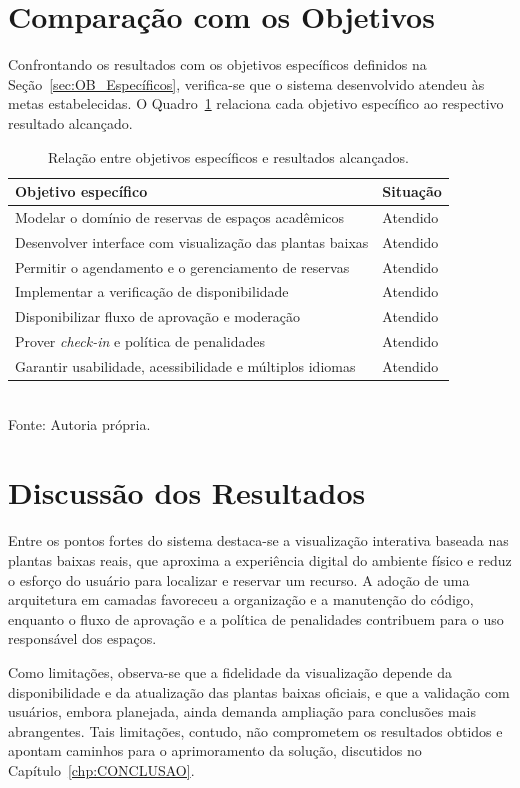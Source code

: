 \section{Comparação com os Objetivos}\label{sec:comparacao}

Confrontando os resultados com os objetivos específicos definidos na Seção~\ref{sec:OB_Específicos}, verifica-se que o sistema desenvolvido atendeu às metas estabelecidas. O Quadro~\ref{quadro:objetivos} relaciona cada objetivo específico ao respectivo resultado alcançado.

\begin{table}[H]
  \centering
  \caption{Relação entre objetivos específicos e resultados alcançados.}
  \label{quadro:objetivos}
  \begin{tabular}{|p{7.5cm}|p{4cm}|}
    \hline
    \textbf{Objetivo específico} & \textbf{Situação} \\
    \hline
    Modelar o domínio de reservas de espaços acadêmicos & Atendido \\
    \hline
    Desenvolver interface com visualização das plantas baixas & Atendido \\
    \hline
    Permitir o agendamento e o gerenciamento de reservas & Atendido \\
    \hline
    Implementar a verificação de disponibilidade & Atendido \\
    \hline
    Disponibilizar fluxo de aprovação e moderação & Atendido \\
    \hline
    Prover \textit{check-in} e política de penalidades & Atendido \\
    \hline
    Garantir usabilidade, acessibilidade e múltiplos idiomas & Atendido \\
    \hline
  \end{tabular}\\
  {\footnotesize Fonte: Autoria própria.}
\end{table}

\section{Discussão dos Resultados}\label{sec:discussao}

Entre os pontos fortes do sistema destaca-se a visualização interativa baseada nas plantas baixas reais, que aproxima a experiência digital do ambiente físico e reduz o esforço do usuário para localizar e reservar um recurso. A adoção de uma arquitetura em camadas favoreceu a organização e a manutenção do código, enquanto o fluxo de aprovação e a política de penalidades contribuem para o uso responsável dos espaços.

Como limitações, observa-se que a fidelidade da visualização depende da disponibilidade e da atualização das plantas baixas oficiais, e que a validação com usuários, embora planejada, ainda demanda ampliação para conclusões mais abrangentes. Tais limitações, contudo, não comprometem os resultados obtidos e apontam caminhos para o aprimoramento da solução, discutidos no Capítulo~\ref{chp:CONCLUSAO}.
\pagebreak